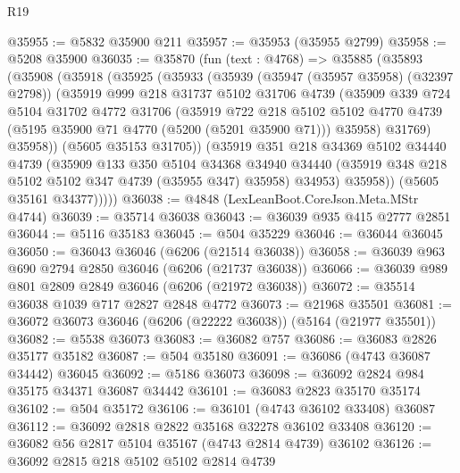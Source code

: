 \begin{lexlean}{R19}
\begin{coremodule}
{{{{{{{{{{{@35955 := @5832 @35900 @211
@35957 := @35953 (@35955 @2799)
@35958 := @5208 @35900
@36035 := @35870
    (fun (text : @4768) =>
    @35885
      (@35893
        (@35908
          (@35918
            (@35925
              (@35933
                (@35939
                  (@35947 (@35957 @35958) (@32397 @2798))
                  (@35919
                    @999
                    @218
                    @31737
                    @5102
                    @31706
                    @4739
                    (@35909
                      @339
                      @724
                      @5104
                      @31702
                      @4772
                      @31706
                      (@35919
                        @722
                        @218
                        @5102
                        @5102
                        @4770
                        @4739
                        (@5195 @35900 @71 @4770 (@5200 (@5201 @35900 @71)))
                        @35958)
                      @31769)
                    @35958))
                (@5605 @35153 @31705))
              (@35919
                @351
                @218
                @34369
                @5102
                @34440
                @4739
                (@35909
                  @133
                  @350
                  @5104
                  @34368
                  @34940
                  @34440
                  (@35919 @348 @218 @5102 @5102 @347 @4739 (@35955 @347) @35958)
                  @34953)
                @35958))
            (@5605 @35161 @34377)))))
@36038 := @4848 (LexLeanBoot.CoreJson.Meta.MStr @4744)
@36039 := @35714 @36038
@36043 := @36039 @935 @415 @2777 @2851
@36044 := @5116 @35183
@36045 := @504 @35229
@36046 := @36044 @36045
@36050 := @36043 @36046 (@6206 (@21514 @36038))
@36058 := @36039 @963 @690 @2794 @2850 @36046 (@6206 (@21737 @36038))
@36066 := @36039 @989 @801 @2809 @2849 @36046 (@6206 (@21972 @36038))
@36072 := @35514 @36038 @1039 @717 @2827 @2848 @4772
@36073 := @21968 @35501
@36081 := @36072 @36073 @36046 (@6206 (@22222 @36038)) (@5164 (@21977 @35501))
@36082 := @5538 @36073
@36083 := @36082 @757
@36086 := @36083 @2826 @35177 @35182
@36087 := @504 @35180
@36091 := @36086 (@4743 @36087 @34442) @36045
@36092 := @5186 @36073
@36098 := @36092 @2824 @984 @35175 @34371 @36087 @34442
@36101 := @36083 @2823 @35170 @35174
@36102 := @504 @35172
@36106 := @36101 (@4743 @36102 @33408) @36087
@36112 := @36092 @2818 @2822 @35168 @32278 @36102 @33408
@36120 := @36082 @56 @2817 @5104 @35167 (@4743 @2814 @4739) @36102
@36126 := @36092 @2815 @218 @5102 @5102 @2814 @4739
}}}}}}}}}}}
\end{coremodule}
\end{lexlean}
